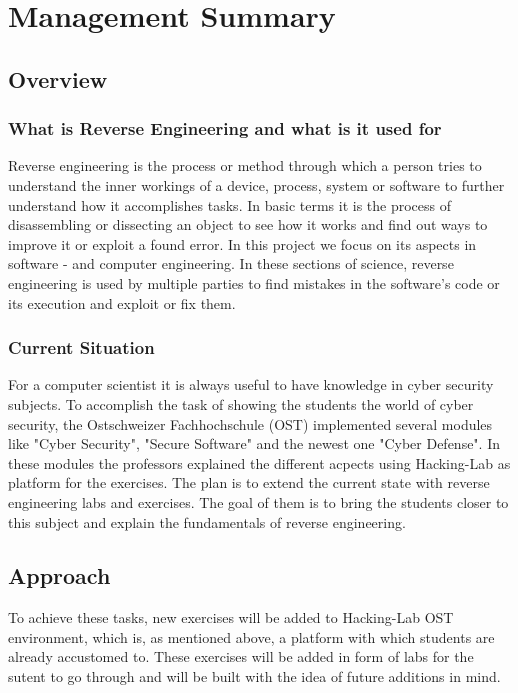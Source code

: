 \chapter{Management Summary}
\section{Overview}
\subsection{What is Reverse Engineering and what is it used for}
Reverse engineering is the process or method through which a person tries to understand the inner workings of a device, process, system or software to further understand how it accomplishes tasks. In basic terms it is the process of disassembling or dissecting an object to see how it works and find out ways to improve it or exploit a found error. In this project we focus on its aspects in software - and computer engineering. In these sections of science, reverse engineering is used by multiple parties to find mistakes in the software's code or its execution and exploit or fix them. 

\subsection{Current Situation}
For a computer scientist it is always useful to have knowledge in cyber security subjects. To accomplish the task of showing the students the world of cyber security, the Ostschweizer Fachhochschule (OST) implemented several modules like "Cyber Security", "Secure Software" and the newest one "Cyber Defense". In these modules the professors explained the different acpects using Hacking-Lab as platform for the exercises. The plan is to extend the current state with reverse engineering labs and exercises. The goal of them is to bring the students closer to this subject and explain the fundamentals of reverse engineering.

\section{Approach}
To achieve these tasks, new exercises will be added to Hacking-Lab OST environment, which is, as mentioned above, a platform with which students are already accustomed to. These exercises will be added in form of labs for the sutent to go through and will be built with the idea of future additions in mind.

